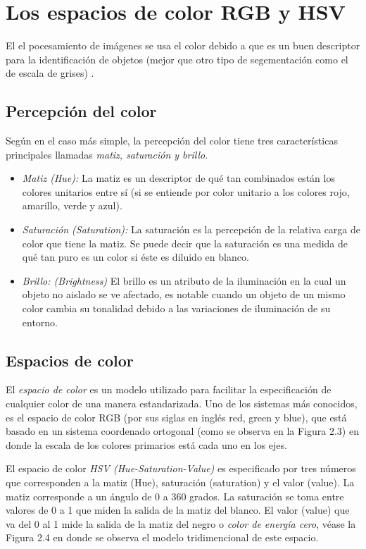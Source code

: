 	\section{Los espacios de color RGB y HSV}
El el pocesamiento de imágenes se usa el color debido a que es un buen descriptor para la identificación de objetos (mejor que otro tipo de segementación como el de escala de grises) \cite{gonzalez2002digital}.
		\subsection*{Percepción del color}
Según \cite{agoston2005computer} en el caso más simple, la percepción del color tiene tres características principales llamadas \textit{matiz, saturación y brillo}. 
\begin{itemize}
\item \textit{Matiz (Hue):} La matiz es un descriptor de qué tan combinados están los colores unitarios entre sí (si se entiende por color unitario a los colores rojo, amarillo, verde y azul).

\item \textit{Saturación (Saturation): } La saturación es la percepción de la relativa carga de color que tiene la matiz. Se puede decir que la saturación es una medida de qué tan puro es un color si éste es diluido en blanco.

\item \textit{Brillo: (Brightness)} El brillo es un atributo de la iluminación en la cual un objeto no aislado se ve afectado, es notable cuando un objeto de un  mismo color cambia su tonalidad debido a las variaciones de iluminación de su entorno.
\end{itemize}
		\subsection*{Espacios de color}
El \textit{espacio de color} es un modelo utilizado para facilitar la especificación de cualquier color de una manera estandarizada. Uno de los sistemas más conocidos, es el espacio de color RGB (por sus siglas en inglés red, green y blue), que está basado en un sistema coordenado ortogonal (como se observa en la Figura 2.3) en donde la escala de los colores primarios está cada uno en los ejes.

El espacio de color \textit{HSV (Hue-Saturation-Value)} es especificado por tres números que corresponden a la matiz (Hue), saturación (saturation) y el valor (value). La matiz corresponde a un ángulo de 0 a 360 grados. La saturación se toma entre valores de 0 a 1 que miden la salida de la matiz del blanco. El valor (value) que va del 0 al 1 mide la salida de la matiz del negro o \textit{color de energía cero}, véase la Figura 2.4 en donde se observa el modelo tridimencional de este espacio.

